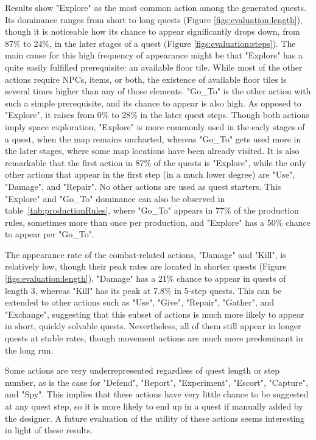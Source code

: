 Results show "Explore" as the most common action among the generated quests. Its dominance ranges from short to long quests (Figure \ref{figs:evaluation:length}), though it is noticeable how its chance to appear significantly drops down, from 87\% to 24\%, in the later stages of a quest (Figure \ref{figs:evaluation:steps}). The main cause for this high frequency of appearance might be that "Explore" has a quite easily fulfilled prerequisite: an available floor tile. While most of the other actions require NPCs, items, or both, the existence of available floor tiles is several times higher than any of those elements. "Go\_To" is the other action with such a simple prerequisite, and its chance to appear is also high. As opposed to "Explore", it raises from 0\% to 28\% in the later quest steps. Though both actions imply space exploration, "Explore" is more commonly used in the early stages of a quest, when the map remains uncharted, whereas "Go\_To" gets used more in the later stages, where some map locations have been already visited. It is also remarkable that the first action in 87\% of the quests is "Explore", while the only other actions that appear in the first step (in a much lower degree) are "Use", "Damage", and "Repair". No other actions are used as quest starters. This "Explore" and "Go\_To" dominance can also be observed in table~\ref{tab:productionRules}, where "Go\_To" appears in 77\% of the production rules, sometimes more than once per production, and "Explore" has a 50\% chance to appear per "Go\_To".

The appearance rate of the combat-related actions, "Damage" and "Kill", is relatively low, though their peak rates are located in shorter quests (Figure \ref{figs:evaluation:length}). "Damage" has a 21\% chance to appear in quests of length 3, whereas "Kill" has its peak at 7.8\% in 5-step quests. This can be extended to other actions such as "Use", "Give", "Repair", "Gather", and "Exchange", suggesting that this subset of actions is much more likely to appear in short, quickly solvable quests. Nevertheless, all of them still appear in longer quests at stable rates, though movement actions are much more predominant in the long run. 

Some actions are very underrepresented regardless of quest length or step number, as is the case for "Defend", "Report", "Experiment", "Escort", "Capture", and "Spy". This implies that these actions have very little chance to be suggested at any quest step, so it is more likely to end up in a quest if manually added by the designer. A future evaluation of the utility of these actions seems interesting in light of these results.

